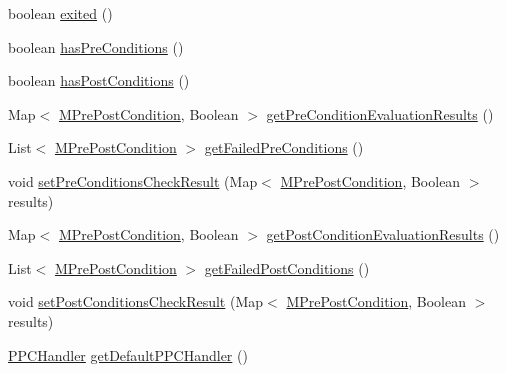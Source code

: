 \begin{DoxyCompactItemize}
\item 
boolean \hyperlink{classorg_1_1tzi_1_1use_1_1uml_1_1sys_1_1_m_operation_call_a43bea728c438b67068d9aacf900e7235}{exited} ()
\item 
boolean \hyperlink{classorg_1_1tzi_1_1use_1_1uml_1_1sys_1_1_m_operation_call_a0205f57340b1cfa6eda25d98069c6a87}{has\-Pre\-Conditions} ()
\item 
boolean \hyperlink{classorg_1_1tzi_1_1use_1_1uml_1_1sys_1_1_m_operation_call_acaba8c0618d50888ede62adc24e83387}{has\-Post\-Conditions} ()
\item 
Map$<$ \hyperlink{classorg_1_1tzi_1_1use_1_1uml_1_1mm_1_1_m_pre_post_condition}{M\-Pre\-Post\-Condition}, Boolean $>$ \hyperlink{classorg_1_1tzi_1_1use_1_1uml_1_1sys_1_1_m_operation_call_a98e11bb23477e86251e5563c085482be}{get\-Pre\-Condition\-Evaluation\-Results} ()
\item 
List$<$ \hyperlink{classorg_1_1tzi_1_1use_1_1uml_1_1mm_1_1_m_pre_post_condition}{M\-Pre\-Post\-Condition} $>$ \hyperlink{classorg_1_1tzi_1_1use_1_1uml_1_1sys_1_1_m_operation_call_a7ca2dad5d36ef0d5cb7eee85ad69683e}{get\-Failed\-Pre\-Conditions} ()
\item 
void \hyperlink{classorg_1_1tzi_1_1use_1_1uml_1_1sys_1_1_m_operation_call_a03be9b0261993235319f31700c6b13f3}{set\-Pre\-Conditions\-Check\-Result} (Map$<$ \hyperlink{classorg_1_1tzi_1_1use_1_1uml_1_1mm_1_1_m_pre_post_condition}{M\-Pre\-Post\-Condition}, Boolean $>$ results)
\item 
Map$<$ \hyperlink{classorg_1_1tzi_1_1use_1_1uml_1_1mm_1_1_m_pre_post_condition}{M\-Pre\-Post\-Condition}, Boolean $>$ \hyperlink{classorg_1_1tzi_1_1use_1_1uml_1_1sys_1_1_m_operation_call_a9b64ce84489c0ae210d5a921c8598631}{get\-Post\-Condition\-Evaluation\-Results} ()
\item 
List$<$ \hyperlink{classorg_1_1tzi_1_1use_1_1uml_1_1mm_1_1_m_pre_post_condition}{M\-Pre\-Post\-Condition} $>$ \hyperlink{classorg_1_1tzi_1_1use_1_1uml_1_1sys_1_1_m_operation_call_aed4fa008071175a2c9eada993ba1b87d}{get\-Failed\-Post\-Conditions} ()
\item 
void \hyperlink{classorg_1_1tzi_1_1use_1_1uml_1_1sys_1_1_m_operation_call_a4983cfea323602957b83b2acd3c57f24}{set\-Post\-Conditions\-Check\-Result} (Map$<$ \hyperlink{classorg_1_1tzi_1_1use_1_1uml_1_1mm_1_1_m_pre_post_condition}{M\-Pre\-Post\-Condition}, Boolean $>$ results)
\item 
\hyperlink{interfaceorg_1_1tzi_1_1use_1_1uml_1_1sys_1_1ppc_handling_1_1_p_p_c_handler}{P\-P\-C\-Handler} \hyperlink{classorg_1_1tzi_1_1use_1_1uml_1_1sys_1_1_m_operation_call_aa1a56abe59d9253fca92c8562c747757}{get\-Default\-P\-P\-C\-Handler} ()

\end{DoxyCompactItemize}
